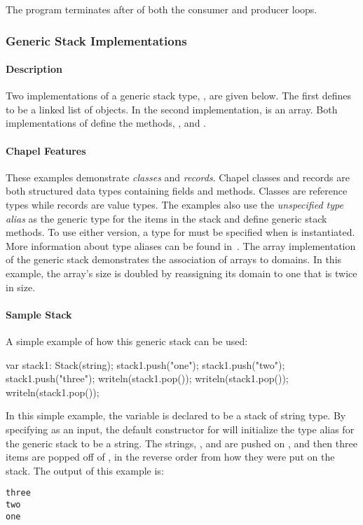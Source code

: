 The program terminates after  of both the consumer and
producer loops.

\subsubsection{Generic Stack Implementations}
\paragraph{Description}
Two implementations of a generic stack type, , are given below.  The first
defines  to be a linked list of  objects.  In
the second implementation,  is an array.  Both implementations of
 define the methods, , 
 and . 

\paragraph{Chapel Features}
These examples demonstrate {\em classes} and {\em records}.  
Chapel classes and records
are both structured data types containing fields and methods.
Classes are reference types while records are value types.
The examples also
use the {\em unspecified type alias}  as the generic type for the items
in the stack and define generic stack methods.  To use either version,
a type for  must be specified when  is instantiated.
More information about type aliases can be found 
in~.  The array implementation of
the generic stack demonstrates
the association of arrays to domains.  In this example, the array's size is
doubled by reassigning its domain to one that is twice in size.

\paragraph{Sample Stack}
A simple example of how this generic stack can be used:
\begin{chapel}
var stack1: Stack(string);
stack1.push("one");
stack1.push("two");
stack1.push("three");
writeln(stack1.pop());
writeln(stack1.pop());
writeln(stack1.pop());
\end{chapel}
In this simple example, the variable  is declared to be a
stack of string type.
By specifying  as an input, the default constructor for 
will initialize the type alias for the generic stack to be a string.
The strings, ,  and 
are pushed on , and then three items are popped off of ,
in the reverse order from how they were put on the stack.
The output of this example is:
{\small
\begin{verbatim}
three
two
one
\end{verbatim}}

